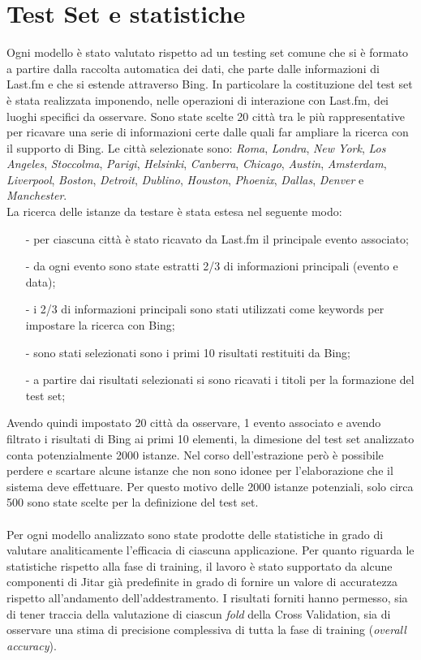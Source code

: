 \documentclass[a4paper]{report}
\begin{document}
\section{Test Set e statistiche}
Ogni modello è stato valutato rispetto ad un testing set comune che si è formato a partire dalla raccolta automatica dei dati, che parte dalle informazioni di Last.fm e che si estende attraverso Bing. In particolare la costituzione del test set è stata realizzata imponendo, nelle operazioni di interazione con Last.fm, dei luoghi specifici da osservare. Sono state scelte 20 città tra le più rappresentative per ricavare una serie di informazioni certe dalle quali far ampliare la ricerca con il supporto di Bing. Le città selezionate sono: \textit{Roma}, \textit{Londra}, \textit{New York}, \textit{Los Angeles}, \textit{Stoccolma}, \textit{Parigi}, \textit{Helsinki}, \textit{Canberra}, \textit{Chicago}, \textit{Austin}, \textit{Amsterdam}, \textit{Liverpool}, \textit{Boston}, \textit{Detroit}, \textit{Dublino}, \textit{Houston}, \textit{Phoenix}, \textit{Dallas}, \textit{Denver} e \textit{Manchester}. \\
La ricerca delle istanze da testare è stata estesa nel seguente modo:
\begin{itemize}
\item[\--] per ciascuna città è stato ricavato da Last.fm il principale evento associato;
\item[\--] da ogni evento sono state estratti 2/3 di informazioni principali (evento e data);
\item[\--] i 2/3 di informazioni principali sono stati utilizzati come keywords per impostare la ricerca con Bing;
\item[\--] sono stati selezionati sono i primi 10 risultati restituiti da Bing;
\item[\--] a partire dai risultati selezionati si sono ricavati i titoli per la formazione del test set;
\end{itemize}
Avendo quindi impostato 20 città da osservare, 1 evento associato e avendo filtrato i risultati di Bing ai primi 10 elementi, la dimesione del test set analizzato conta potenzialmente 2000 istanze. Nel corso dell'estrazione però è possibile perdere e scartare alcune istanze che non sono idonee per l'elaborazione che il sistema deve effettuare. Per questo motivo delle 2000 istanze potenziali, solo circa 500 sono state scelte per la definizione del test set. \\
\\
Per ogni modello analizzato sono state prodotte delle statistiche in grado di valutare analiticamente l'efficacia di ciascuna applicazione. Per quanto riguarda le statistiche rispetto alla fase di training, il lavoro è stato supportato da alcune componenti di Jitar già predefinite in grado di fornire un valore di accuratezza rispetto all'andamento dell'addestramento. I risultati forniti hanno permesso, sia di tener traccia della valutazione di ciascun \textit{fold} della Cross Validation, sia di osservare una stima di precisione complessiva di tutta la fase di training (\textit{overall accuracy}). \\
\end{document}
